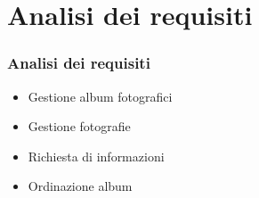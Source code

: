 
\section{Analisi dei requisiti}
\begin{frame}

  \frametitle{Analisi dei requisiti}

  \begin{itemize}
  \item Gestione album fotografici
  \item Gestione fotografie
  \item Richiesta di informazioni
  \item Ordinazione album
  \end{itemize}
  
\end{frame}
